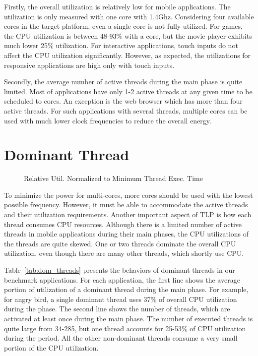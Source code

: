 Firstly, the overall utilization is relatively low for mobile applications. The utilization is
only measured with one core with 1.4Ghz. Considering four available cores in the target platform,
even a single core is not fully utilized. For games, the CPU utilization is between 48-93\%
with a core, but the movie player exhibits much lower 25\% utilization. For interactive
applications, touch inputs do not affect the CPU utilization significantly. However, as expected,
the utilizations for responsive applications are high only with touch inputs. 

Secondly, the average number of active threads during the main phase is quite limited. Most
of applications have only 1-2 active threads at any given time to be scheduled to cores. 
An exception is the web browser which has more than four active threads. For such applications
with several threads, multiple cores can be used with much lower clock frequencies to reduce
the overall energy.

\section{Dominant Thread}



\begin{figure}[relative_util]
\begin{center}
\end{center}
\caption{Relative Util. Normalized to Minimum Thread Exec. Time}
\label{fig:relative_util}
\end{figure}



To minimize the power for multi-cores, more cores should be used with the lowest possible frequency.
However, it must be able to accommodate the active threads and their utilization requirements. 
Another important aspect of TLP is how each thread consumes CPU resources. Although there is 
a limited number of active threads in mobile applications during their main phases, the CPU utilizations
of the threads are quite skewed. One or two threads dominate the overall CPU utilization, even though
there are many other threads, which shortly use CPU.

Table~\ref{tab:dom_threads} presents the behaviors of dominant threads in our benchmark applications.
For each application, the first line shows the average portion of utilization of a dominant thread during
the main phase. For example, for angry bird, a single dominant thread uses 37\% of overall CPU utilization 
during the phase. The second line shows the number of threads, which are activated at least once 
during the main phase. The number of
executed threads is quite large from 34-285, but one thread accounts for 25-53\% of CPU utilization during
the period. All the other non-dominant threads consume a very small portion of the CPU utilization.

